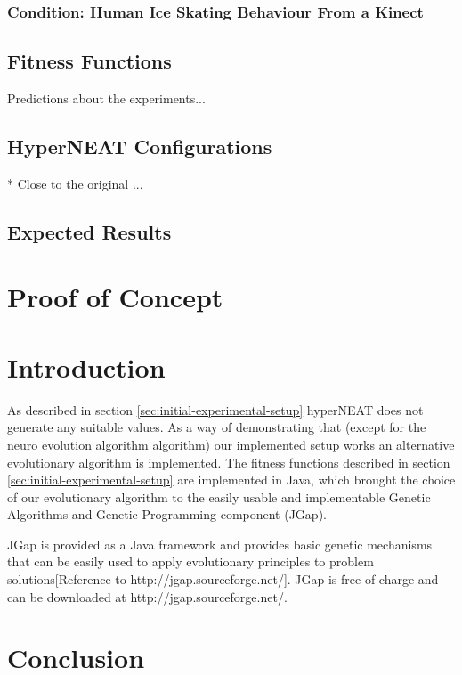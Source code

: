 \documentclass[a4paper,10pt]{article}
\begin{document}
\subsubsection{Condition: Human Ice Skating Behaviour From a Kinect}


\subsection{Fitness Functions}


Predictions about the experiments...


\subsection{HyperNEAT Configurations}
* Close to the original ...

\subsection{Expected Results}



\section{Proof of Concept}
\label{sec:proof-of-concept}
\section{Introduction}
\label{sec:introductionProofOfConcept}
As described in section \ref{sec:initial-experimental-setup} hyperNEAT does not generate any suitable values. As a way of demonstrating that (except for the neuro evolution algorithm algorithm) our implemented setup works an alternative evolutionary algorithm is implemented. The fitness functions described in section \ref{sec:initial-experimental-setup} are implemented in Java, which brought the choice of our evolutionary algorithm to the easily usable and implementable Genetic Algorithms and Genetic Programming component (JGap). 

JGap is provided as a Java framework and provides basic genetic mechanisms that can be easily used to apply evolutionary principles to problem solutions[Reference to http://jgap.sourceforge.net/]. JGap is free of charge and can be downloaded at http://jgap.sourceforge.net/. 

\section{Conclusion}
\label{sec:conclusion}




\end{document}

